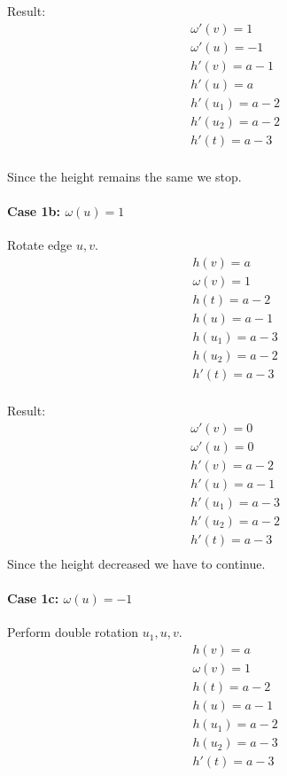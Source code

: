 Result:
\[
\begin{split}
& \omega'(v) = 1 \\
& \omega'(u) = -1 \\
& h'(v) = a - 1 \\
& h'(u) = a \\
& h'(u_1) = a - 2 \\
& h'(u_2) = a - 2 \\
& h'(t) = a - 3 \\
\end{split}
\]

Since the height remains the same we stop.

\paragraph*{\textbf{Case 1b}: $\omega(u) = 1$}
Rotate edge $u, v$.
\[
\begin{split}
& h(v) = a \\
& \omega(v) = 1 \\
& h(t) = a - 2 \\
& h(u) = a - 1 \\
& h(u_1) = a - 3 \\
& h(u_2) = a - 2 \\
& h'(t) = a - 3 \\
\end{split}
\]

Result:
\[
\begin{split}
& \omega'(v) = 0 \\
& \omega'(u) = 0 \\
& h'(v) = a - 2 \\
& h'(u) = a - 1\\
& h'(u_1) = a - 3 \\
& h'(u_2) = a - 2 \\
& h'(t) = a - 3 \\
\end{split}
\]
Since the height decreased we have to continue.

\paragraph*{\textbf{Case 1c}: $\omega(u) = -1$}
Perform double rotation $u_1, u, v$.
\[
\begin{split}
& h(v) = a \\
& \omega(v) = 1 \\
& h(t) = a - 2 \\
& h(u) = a - 1 \\
& h(u_1) = a - 2 \\
& h(u_2) = a - 3 \\
& h'(t) = a - 3 \\
\end{split}
\]

